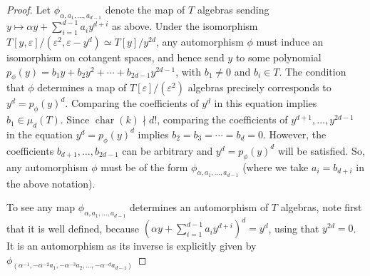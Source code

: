 \documentclass[12 pt]{amsart}
\theoremstyle{plain}
\theoremstyle{definition}
\theoremstyle{remark}
\numberwithin{equation}{section}
\DeclareMathOperator\chr{\operatorname{char}}
\begin{document}
\begin{proof}
Let $\phi_{\alpha, a_1, \ldots, a_{d-1}}$ denote the map of $T$ algebras
sending $y \mapsto \alpha y + \sum_{i=1}^{d-1} a_i y^{d+i}$ as above.  Under
the isomorphism 
$T[y,\varepsilon]/(\varepsilon^2, \varepsilon-y^d) \simeq T[y]/y^{2d}$, 
any automorphism $\phi$ must induce an
isomorphism on cotangent spaces, and hence send $y$ to some polynomial
$p_\phi(y) = b_1 y + b_2 y^2 + \cdots + b_{2d-1}y^{2d-1}$, with $b_1 \neq 0$
and $b_i \in T$.  The condition that $\phi$ determines a map of 
$T[\varepsilon]/(\varepsilon^2)$ algebras precisely
corresponds to $y^d = p_\phi(y)^d$. Comparing the coefficients of $y^d$ in this
equation implies $b_1 \in \mu_d(T)$.  Since $\chr(k) \nmid  d!$, comparing the
coefficients of $y^{d+1}, \ldots, y^{2d-1}$ in the equation $y^d = p_\phi(y)^d$
implies $b_2 = b_3 = \cdots = b_d = 0$.  However, the coefficients $b_{d+1},
\ldots, b_{2d-1}$ can be arbitrary and $y^d = p_\phi(y)^d$ will be satisfied.
So, any automorphism $\phi$ must be of the form $\phi_{\alpha, a_1, \ldots,
a_{d-1}}$ (where we take $a_i = b_{d+i}$ in the above notation).

To see any map $\phi_{\alpha, a_1, \ldots, a_{d-1}}$ determines an automorphism
of $T$ algebras, note first that it is well defined, because $(\alpha y +
\sum_{i=1}^{d-1} a_i y^{d+i})^d = y^d$, using that $y^{2d} = 0$.  It is an
automorphism as its inverse is explicitly given by
$\phi_{\left( \alpha^{-1}, -\alpha^{-2} a_1, -\alpha^{-3} a_2, \ldots, - \alpha^{-d} a_{d-1}
\right)}$ \end{proof}
\end{document}
